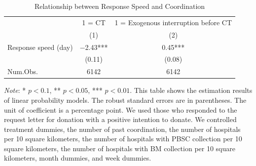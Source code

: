 \documentclass[12pt, a4paper]{article}
\begin{document}
\begin{table}[H]

\caption{\label{tab:response-speed-CT}Relationship between Response Speed and Coordination}
\centering
\fontsize{9}{11}\selectfont
\begin{threeparttable}
\begin{tabular}[t]{lcc}
\toprule
\multicolumn{1}{c}{ } & \multicolumn{1}{c}{1 = CT} & \multicolumn{1}{c}{1 = Exogenous interruption before CT} \\
\cmidrule(l{3pt}r{3pt}){2-2} \cmidrule(l{3pt}r{3pt}){3-3}
  & (1) & (2)\\
\midrule
Response speed (day) & \num{-2.43}*** & \num{0.45}***\\
 & (\num{0.11}) & (\num{0.08})\\
\midrule
Num.Obs. & \num{6142} & \num{6142}\\
\bottomrule
\end{tabular}
\begin{tablenotes}
\item \emph{Note}: * $p < 0.1$, ** $p < 0.05$, *** $p < 0.01$. This table shows the estimation results of linear probability models. The robust standard errors are in parentheses. The unit of coefficient is a percentage point. We used those who responded to the request letter for donation with a positive intention to donate. We controlled treatment dummies, the number of past coordination, the number of hospitals per 10 square kilometers, the number of hospitals with PBSC collection per 10 square kilometers, the number of hospitals with BM collection per 10 square kilometers, month dummies, and week dummies.
\end{tablenotes}
\end{threeparttable}
\end{table}
\end{document}
